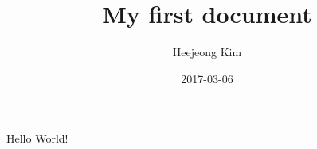 \documentclass{article}
\title{My first document}
\date{2017-03-06}
\author{Heejeong Kim}
\begin{document}
\maketitle
\newpage
{}

Hello World!
\end{document}
